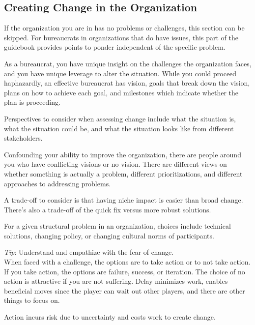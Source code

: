 \subsection*{Creating Change in the Organization\label{sec:creating-change}}

If the organization you are in has no problems or challenges, this section can be skipped. For bureaucrats in organizations that do have issues, this part of the guidebook provides points to ponder independent of the specific problem.

As a bureaucrat, you have unique insight on the challenges the organization faces, and you have unique leverage to alter the situation.  While you could proceed haphazardly, an effective bureaucrat has vision, goals that break down the vision, plans on how to achieve each goal, and milestones which indicate whether the plan is proceeding. 

Perspectives to consider when assessing change include what the situation is, what the situation could be, and what the situation looks like from different stakeholders.

Confounding your ability to improve the organization, there are people around you who have conflicting visions or no vision. There are different views on whether something is actually a problem, different prioritizations, and different approaches to addressing problems.

A trade-off to consider is that having niche impact is easier than broad change. There's also a trade-off of the quick fix versus more robust solutions.

For a given structural problem in an organization, choices include technical solutions, changing policy, or changing cultural norms of participants.



\textit{Tip}: Understand and empathize with the fear of change. \\

When faced with a challenge, the options are to take action or to not take action. If you take action, the options are failure, success, or iteration. 
The choice of no action is attractive if you are not suffering. Delay minimizes work, enables beneficial moves since the player can wait out other players, and there are other things to focus on.

Action incurs risk due to uncertainty and costs work to create change.

